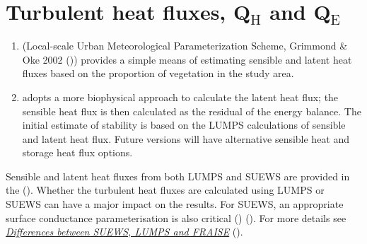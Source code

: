 \documentclass[letterpaper,10pt,english]{sphinxmanual}
\begin{document}
\section{Turbulent heat fluxes, Q$_{\text{H}}$ and Q$_{\text{E}}$}
\label{\detokenize{parameterisations-and-sub-models:turbulent-heat-fluxes-qh-and-qe}}\begin{enumerate}
\item {} 
 (Local-scale Urban Meteorological Parameterization Scheme,
Grimmond \& Oke 2002 \label{\detokenize{parameterisations-and-sub-models:id13}}{\hyperref[\detokenize{references:go2002}]{\sphinxcrossref{{[}GO2002{]}}}} ()) provides a simple means of estimating
sensible and latent heat fluxes based on the proportion of vegetation
in the study area.

\item {} 
 adopts a more biophysical approach to calculate the latent
heat flux; the sensible heat flux is then calculated as the residual
of the energy balance. The initial estimate of stability is based on
the LUMPS calculations of sensible and latent heat flux. Future
versions will have alternative sensible heat and storage heat flux
options.

\end{enumerate}

Sensible and latent heat fluxes from both LUMPS and SUEWS are provided
in the {\hyperref[\detokenize{output-files:output-files}]{}} (). Whether the turbulent heat
fluxes are calculated using LUMPS or SUEWS can have a major impact on
the results. For SUEWS, an appropriate surface conductance
parameterisation is also critical \label{\detokenize{parameterisations-and-sub-models:id14}}{\hyperref[\detokenize{references:j11}]{\sphinxcrossref{{[}J11{]}}}} () \label{\detokenize{parameterisations-and-sub-models:id15}}{\hyperref[\detokenize{references:w16}]{\sphinxcrossref{{[}W16{]}}}} (). For more details see
{\hyperref[\detokenize{parameterisations-and-sub-models:Differences_between_SUEWS,_LUMPS_and_FRAISE}]{\emph{Differences between SUEWS, LUMPS and
FRAISE}}} ().
\end{document}

